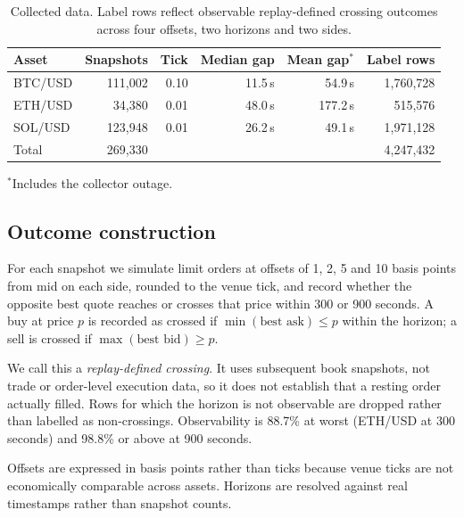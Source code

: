 \documentclass[11pt]{article}
\begin{document}
\begin{table}[ht]
\centering
\caption{Collected data. Label rows reflect observable replay-defined crossing
outcomes across four offsets, two horizons and two sides.}
\label{tab:data}
\begin{tabular}{lrrrrr}
\toprule
Asset & Snapshots & Tick & Median gap & Mean gap$^{*}$ & Label rows \\
\midrule
BTC/USD & 111{,}002 & 0.10 & 11.5\,s & 54.9\,s & 1{,}760{,}728 \\
ETH/USD & 34{,}380 & 0.01 & 48.0\,s & 177.2\,s & 515{,}576 \\
SOL/USD & 123{,}948 & 0.01 & 26.2\,s & 49.1\,s & 1{,}971{,}128 \\
\midrule
Total & 269{,}330 & & & & 4{,}247{,}432 \\
\bottomrule
\end{tabular}

\vspace{0.4em}
{\footnotesize $^{*}$Includes the collector outage.}
\end{table}

\subsection{Outcome construction}
\label{sec:labels}

For each snapshot we simulate limit orders at offsets of 1, 2, 5 and 10 basis
points from mid on each side, rounded to the venue tick, and record whether the
opposite best quote reaches or crosses that price within 300 or 900 seconds. A
buy at price $p$ is recorded as crossed if
$\min(\text{best ask}) \leq p$ within the horizon; a sell is crossed if
$\max(\text{best bid}) \geq p$.

We call this a \emph{replay-defined crossing}. It uses subsequent book
snapshots, not trade or order-level execution data, so it does not establish
that a resting order actually filled. Rows for which the horizon is not
observable are dropped rather than labelled as non-crossings. Observability is
88.7\% at worst (ETH/USD at 300 seconds) and 98.8\% or above at 900 seconds.

Offsets are expressed in basis points rather than ticks because venue ticks are
not economically comparable across assets. Horizons are resolved against real
timestamps rather than snapshot counts.
\end{document}
